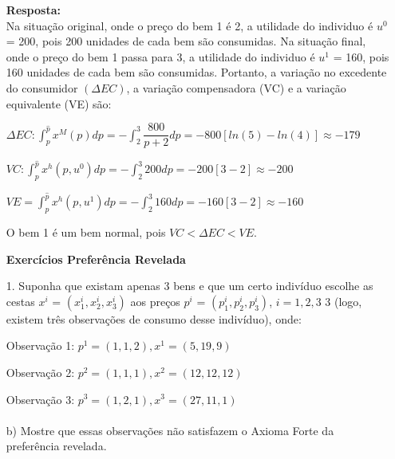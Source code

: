 \begin{enumerate}
\textbf{Resposta:}\\

Na situação original, onde o preço do bem 1 é 2, a utilidade do individuo é {$u^0$} = 200, pois 200 unidades de cada bem são consumidas. Na situação final, onde o preço do bem 1 passa para 3, a utilidade do individuo é {$u^1$} = 160, pois 160 unidades de cada bem são consumidas. Portanto, a variação no excedente do consumidor {$(\Delta EC)$}, a variação compensadora  (VC) e a variação equivalente (VE) são:

\begin{center}
{$\Delta EC: \int_{p}^{\hat{p}} x^{M}(p)dp = - \int_{2}^{3} \dfrac{800}{p + 2}dp = - 800[ln(5) - ln(4)]\approx -179$}
\end{center}

\begin{center}
{$ VC: \int_{p}^{\hat{p}}x^{h}(p, u^{0})dp = - \int_{2}^{3} 200dp = -200[3-2] \approx - 200$}
\end{center}

\begin{center}
{$VE = \int_{p}^{\hat{p}}x^{h}(p, u^{1})dp = - \int_{2}^{3} 160dp = - 160[3-2] \approx - 160$}
\end{center}

O bem 1 é um bem normal, pois {$VC < \Delta EC < VE$}.


\newpage

\begin{center}
\textbf{Exercícios Preferência Revelada}\\
\end{center}

\item[1.] Suponha que existam apenas 3 bens e que um certo indivíduo escolhe as cestas \textbf{{$x^{i}$}} = {$(x_{1}^{i}, x_{2}^{i}, x_{3}^{i})$} aos preços \textbf{{$p^{i}$}} = {$(p_{1}^{i}, p_{2}^{i}, p_{3}^{i})$}, {$i = 1, 2, 3 $} 3 (logo, existem três observações de consumo desse
indivíduo), onde: \\

\begin{center}
Observação 1: {$ p^{1} = (1, 1, 2), x^{1} = (5, 19, 9)$}\

Observação 2: {$ p^{2} = (1, 1, 1), x^{2} = (12, 12, 12)$}\

Observação 3: {$ p^{3} = (1, 2, 1), x^{3} = (27, 11, 1)$}\
\end{center}

\paragraph{} b) Mostre que essas observações não satisfazem o Axioma Forte da preferência revelada.\\


\end{enumerate}
